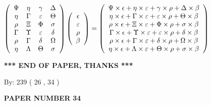 \documentclass[12pt]{article}
\begin{document}
$  %
 \left( \begin{array}
 {
 c
 c
 c
 c
 }
 \Psi & 
 \eta & 
 \gamma & 
 \Delta \\ 
 \eta & 
 \Gamma & 
 \varepsilon & 
 \Theta \\ 
 \rho & 
                    \Xi & 
 \Phi & 
 \sigma \\ 
 \Gamma & 
 \Upsilon & 
 \varepsilon & 
 \delta \\ 
 \rho & 
 \Gamma & 
 \delta & 
 \Omega \\ 
 \eta & 
 \Lambda & 
 \Theta & 
 \sigma
 \end{array} \right)
 \left( \begin{array}
 {
 c
 }
 \epsilon \\ 
 \varepsilon \\ 
 \rho \\ 
 \beta
 \end{array} \right)
=
 \left( \begin{array}
 {
 c
 }
  \Psi \times  \epsilon +  \eta \times  \varepsilon +  \gamma \times  \rho +  \Delta \times  \beta \\ 
  \eta \times  \epsilon +  \Gamma \times  \varepsilon +  \varepsilon \times  \rho +  \Theta \times  \beta \\ 
  \rho \times  \epsilon +                     \Xi \times  \varepsilon +  \Phi \times  \rho +  \sigma \times  \beta \\ 
  \Gamma \times  \epsilon +  \Upsilon \times  \varepsilon +  \varepsilon \times  \rho +  \delta \times  \beta \\ 
  \rho \times  \epsilon +  \Gamma \times  \varepsilon +  \delta \times  \rho +  \Omega \times  \beta \\ 
  \eta \times  \epsilon +  \Lambda \times  \varepsilon +  \Theta \times  \rho +  \sigma \times  \beta
 \end{array} \right)
$
 
   
   
   
   
\vspace{1.0in} 
{\textbf{\large{ *** END OF PAPER, THANKS *** }}} 
   
   
\hspace{1.0in} By: 
         239 (          26 ,           34 )
   
   
   
   
\newpage 
\setcounter{page}{ 
    34001 } 
   
   
 {\textbf{ \Large{ PAPER NUMBER           34  }}}
   
   
   
\end{document}
